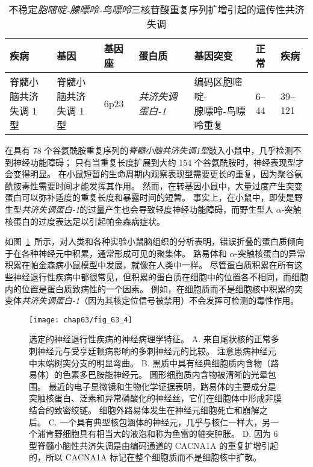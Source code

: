\begin{table}[htbp]
	\caption{不稳定\textit{胞嘧啶-腺嘌呤-鸟嘌呤}三核苷酸重复序列扩增引起的遗传性共济失调} \label{tab:63_2} \centering
	\begin{tabular}{lllllll}
		\toprule
		疾病 & 基因 & 基因座 & 蛋白质 & 基因突变 & 正常 & 疾病 \\
		\midrule
		\makecell{脊髓小脑共济\\失调 1 型} & \makecell{脊髓小脑共济\\失调 1 型} & 6p23 & \textit{共济失调蛋白-1}   & \makecell{编码区胞嘧啶-\\腺嘌呤-鸟嘌呤重复} & 6–44 & 39–121 \\
		\bottomrule
	\end{tabular}
\end{table}


在具有 78 个谷氨酰胺重复序列的\textit{脊髓小脑共济失调1型}敲入小鼠中，几乎检测不到神经功能障碍；
只有当重复长度扩展到大约 154 个谷氨酰胺时，神经表现型才会变得明显。
在小鼠短暂的生命周期内观察表现型需要更长的重复，因为聚谷氨酰胺毒性需要时间才能发挥其作用。
然而，在转基因小鼠中，大量过度产生突变蛋白可以弥补适度的重复长度和暴露时间的短暂。
事实上，在小鼠中，即使是野生型\textit{共济失调蛋白-1}的过量产生也会导致轻度神经功能障碍，而野生型人 $\alpha$-突触核蛋白的过度表达足以引起帕金森病症状。


如图~\ref{fig:63_4}~所示，对人类和各种实验小鼠脑组织的分析表明，错误折叠的蛋白质倾向于在各种神经元中积累，通常形成可见的聚集体。
路易体和 $\alpha$-突触核蛋白的异常积累在帕金森病小鼠模型中发展，就像在人类中一样。
尽管蛋白质积累在所有这些神经退行性疾病中都很常见，但积累的蛋白质在细胞中的位置各不相同，而细胞内的位置是蛋白质致病性的一个因素。
例如，在细胞质而不是细胞核中积累的突变体\textit{共济失调蛋白-1}（因为其核定位信号被禁用）不会发挥可检测的毒性作用。


\begin{figure}[htbp]
	\centering
	\texttt{[image: chap63/fig\_63\_4]}
	\caption{选定的神经退行性疾病的神经病理学特征。
		A. 来自尾状核的正常多刺神经元与受亨廷顿病影响的多刺神经元的比较。
		注意患病神经元中末端树突分支的明显弯曲。
		B. 黑质中具有经典细胞质内含物（路易体）的色素多巴胺能神经元。
		圆形细胞质内含物被清晰的光晕包围。
		最近的电子显微镜和生物化学证据表明，路易体的主要成分是突触核蛋白、泛素和异常磷酸化的神经丝，它们在细胞体中形成非膜结合的致密绞链。
		细胞外路易体发生在神经元细胞死亡和崩解之后。
		C. 一个具有典型核包涵体的神经元，几乎与核仁一样大，另一个浦肯野细胞具有相当大的液泡和称为鱼雷的轴突肿胀。
		D. 因为 6 型脊髓小脑性共济失调是由编码通道的 CACNA1A 的重复扩增引起的，所以 CACNA1A 标记在整个细胞质而不是细胞核中扩散。}
	\label{fig:63_4}
\end{figure}


